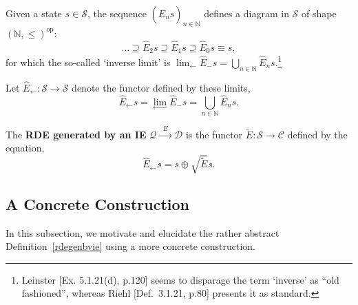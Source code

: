 \documentclass{article}
\newcommand{\N}{\mathbb{N}}
\newcommand{\IE}{\ensuremath{\mathcal{Q} \xrightarrow{\;\;E\;\;} \mathcal{D}}}
\newcommand{\E}{\ensuremath{\widehat{E}}}
\DeclareMathOperator{\dual}{op}
\begin{document}
\begin{fact}
  Given a state $s \in \mathcal{S}$, the sequence $(\E_n s)_{n\in\N}$ defines a diagram in $\mathcal{S}$ of shape $(\N,\le)^{\dual}$:
  $$
  \dots \supseteq \E_2s \supseteq \E_1s \supseteq \E_0s\equiv s,
  $$
for which the so-called `inverse limit' is $\displaystyle{\lim_{\longleftarrow} \E_{-} s} = \bigcup_{n\in\N} \E_n s$.\footnote{Leinster [Ex. 5.1.21(d), p.120] seems to disparage the term `inverse' as ``old fashioned'', whereas Riehl [Def.~3.1.21, p.80] presents it as standard.}
\end{fact}

\begin{nota}
  Let $\E_\leftarrow : \mathcal{S} \rightarrow \mathcal{S}$ denote the functor defined by these limits,
  $$
  \E_\leftarrow s = \displaystyle{\lim_{\longleftarrow} \E_{-} s} = \bigcup_{n\in\N} \E_n s.
  $$
\end{nota}

\begin{defn}\label{rdegenbyie}
  The \textbf{RDE generated by an IE} $\IE$ is the functor $\widetilde{E} : \mathcal{S} \rightarrow \mathcal{C}$ defined by the equation,
  $$
  \E_\leftarrow s = s \oplus \surd\widetilde{E} s.
  $$
  \begin{center}
  \end{center}
\end{defn}

\subsection{A Concrete Construction}

In this subsection, we motivate and elucidate the rather abstract Definition~\ref{rdegenbyie} using a more concrete construction.
\end{document}
